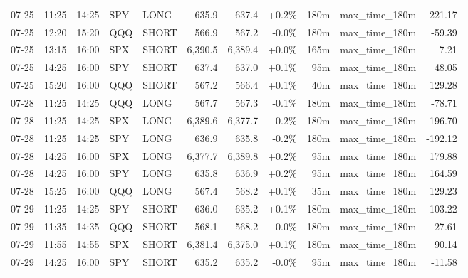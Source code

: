 \documentclass[11pt,a4paper,twoside]{article}
\begin{document}
\begin{center}
\begin{longtable}{>{\color{txtmain}}l l l l l r r r r >{\color{txtmain}}l r}
07-25 & 11:25 & 14:25 & SPY & LONG & 635.9 & 637.4 & \textcolor{wingreen}{+0.2\%} & 180m & max\_time\_180m & \textcolor{wingreen}{221.17} \\
07-25 & 12:20 & 15:20 & QQQ & SHORT & 566.9 & 567.2 & \textcolor{lossred}{-0.0\%} & 180m & max\_time\_180m & \textcolor{lossred}{-59.39} \\
07-25 & 13:15 & 16:00 & SPX & SHORT & 6,390.5 & 6,389.4 & \textcolor{wingreen}{+0.0\%} & 165m & max\_time\_180m & \textcolor{wingreen}{7.21} \\
07-25 & 14:25 & 16:00 & SPY & SHORT & 637.4 & 637.0 & \textcolor{wingreen}{+0.1\%} & 95m & max\_time\_180m & \textcolor{wingreen}{48.05} \\
07-25 & 15:20 & 16:00 & QQQ & SHORT & 567.2 & 566.4 & \textcolor{wingreen}{+0.1\%} & 40m & max\_time\_180m & \textcolor{wingreen}{129.28} \\
07-28 & 11:25 & 14:25 & QQQ & LONG & 567.7 & 567.3 & \textcolor{lossred}{-0.1\%} & 180m & max\_time\_180m & \textcolor{lossred}{-78.71} \\
07-28 & 11:25 & 14:25 & SPX & LONG & 6,389.6 & 6,377.7 & \textcolor{lossred}{-0.2\%} & 180m & max\_time\_180m & \textcolor{lossred}{-196.70} \\
07-28 & 11:25 & 14:25 & SPY & LONG & 636.9 & 635.8 & \textcolor{lossred}{-0.2\%} & 180m & max\_time\_180m & \textcolor{lossred}{-192.12} \\
07-28 & 14:25 & 16:00 & SPX & LONG & 6,377.7 & 6,389.8 & \textcolor{wingreen}{+0.2\%} & 95m & max\_time\_180m & \textcolor{wingreen}{179.88} \\
07-28 & 14:25 & 16:00 & SPY & LONG & 635.8 & 636.9 & \textcolor{wingreen}{+0.2\%} & 95m & max\_time\_180m & \textcolor{wingreen}{164.59} \\
07-28 & 15:25 & 16:00 & QQQ & LONG & 567.4 & 568.2 & \textcolor{wingreen}{+0.1\%} & 35m & max\_time\_180m & \textcolor{wingreen}{129.23} \\
07-29 & 11:25 & 14:25 & SPY & SHORT & 636.0 & 635.2 & \textcolor{wingreen}{+0.1\%} & 180m & max\_time\_180m & \textcolor{wingreen}{103.22} \\
07-29 & 11:35 & 14:35 & QQQ & SHORT & 568.1 & 568.2 & \textcolor{lossred}{-0.0\%} & 180m & max\_time\_180m & \textcolor{lossred}{-27.61} \\
07-29 & 11:55 & 14:55 & SPX & SHORT & 6,381.4 & 6,375.0 & \textcolor{wingreen}{+0.1\%} & 180m & max\_time\_180m & \textcolor{wingreen}{90.14} \\
07-29 & 14:25 & 16:00 & SPY & SHORT & 635.2 & 635.2 & \textcolor{lossred}{-0.0\%} & 95m & max\_time\_180m & \textcolor{lossred}{-11.58} \\

\end{longtable}
\end{center}
\end{document}
